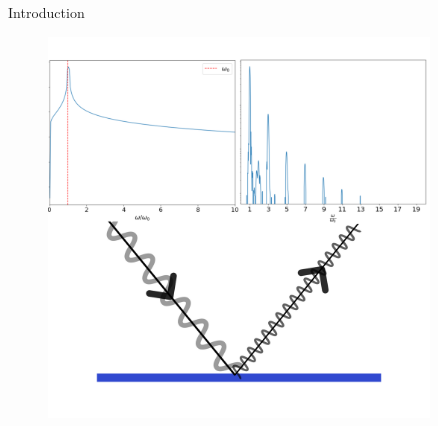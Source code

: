 \documentclass{beamer}
\begin{document}
\begin{frame}{Introduction}
\begin{minipage}[h]{0.48\linewidth}
        \label{fig:field}
    \end{minipage}
    \begin{minipage}[h]{0.48\linewidth}
        \begin{figure}
            \centering
            \includegraphics[width=0.9\textwidth, height=0.42\textheight]{images/harmonics.png}
            \label{fig:harmonics}
        \end{figure}
    \end{minipage}
\end{frame}
\end{document}
